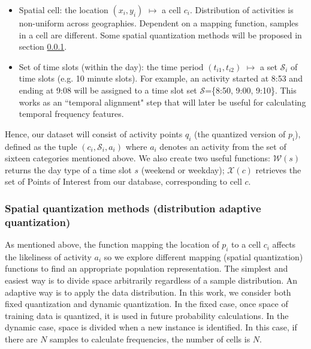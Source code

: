 \documentclass{sig-alternate}
\begin{document}
  \begin{itemize}
  \item Spatial cell: the location $(x_i, y_i)$ $\mapsto$ a cell $c_i$.
  Distribution of activities is non-uniform across geographies. Dependent on a mapping function, samples in a cell are different. Some spatial quantization methods will be proposed in section \ref{sec:spatialquantization}.


  \item Set of time slots (within the day): the time period $(t_{i1}, t_{i2})$ $\mapsto$ a set  $\mathcal{S}_i$ of time slots (e.g. 10 minute slots). For example, an activity started at 8:53 and ending at 9:08 will be assigned to a time slot set  $\mathcal{S}$=\{8:50, 9:00, 9:10\}. This works as an ``temporal alignment" step that will later be useful for calculating temporal frequency features.
\end{itemize}

Hence, our dataset will consist of activity points $q_i$ (the quantized version of $p_i$), defined as the tuple $(c_i, \mathcal{S}_i, a_i )$ where $a_i$ denotes an activity from the set of sixteen categories mentioned above. We also create two useful functions: $\mathcal{W}(s)$ returns the day type of a time slot $s$ (weekend or weekday); $\mathcal{X}(c)$ retrieves the set of Points of Interest from our database, corresponding to cell $c$.

 \subsubsection{Spatial quantization methods (distribution adaptive quantization) } \label{sec:spatialquantization}
As mentioned above, the function mapping the location of $p_i$ to a cell $c_i$ affects the likeliness of activity $a_i$ so we explore different mapping (spatial quantization) functions to find an appropriate population representation.
The simplest and easiest way is to divide space arbitrarily regardless of a sample distribution. An adaptive way is to apply the data distribution. In this work, we consider both fixed quantization and dynamic quantization. In the fixed case, once space of training data is quantized, it is used in future probability calculations. In the dynamic case, space is divided when a new instance is identified. In this case, if there are $N$ samples to calculate frequencies, the number of cells is $N$.
\end{document}
